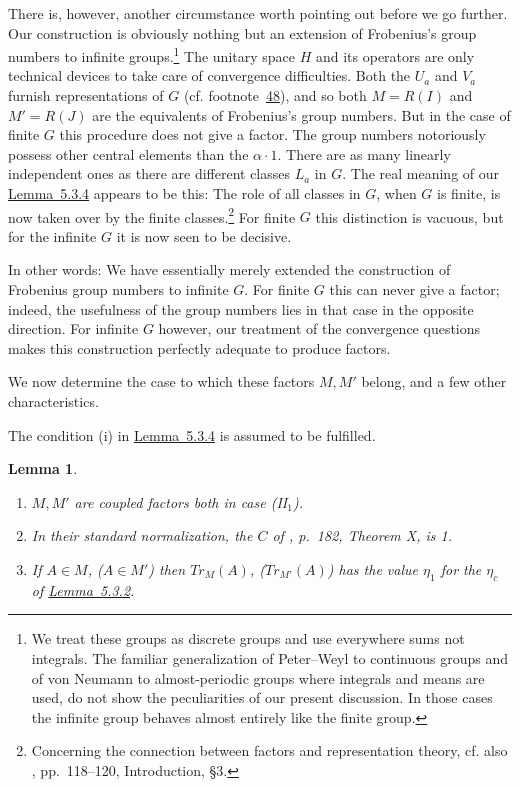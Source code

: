 \documentclass[b5paper,twoside]{article}
\newcommand{\lemref}[2]{\hyperref[#1]{\mbox{Lemma~#2}}}
\theoremstyle{mvnplain}
\newtheorem{lemma}{Lemma}[section]
\newcommand{\M}{\mathbf M}
\newcommand{\R}{\mathbf R}
\newcommand{\Hilbert}{\mathfrak H}
\def\M{M}%
\def\R{R}%
\def\Hilbert{H}%
\def\operatorname#1{#1}%
\def\mathfrak#1{#1}%
\begin{document}
There is, however, another circumstance worth pointing out before we go
further. Our construction is obviously nothing but an extension of
Frobenius's group numbers to infinite groups.\footnote{We treat these groups
as discrete groups and use everywhere sums not integrals. The familiar
generalization of Peter--Weyl to continuous groups and of von Neumann to
almost-periodic groups where integrals and means are used, do not show the
peculiarities of our present discussion. In those cases the infinite group
behaves almost entirely like the finite group.} The unitary space \(\Hilbert\)
and its operators are only technical devices to take care of convergence
difficulties. Both the \(U_a\) and \(V_a\) furnish representations of
\(\mathfrak G\) (cf. footnote~\hyperref[fn:48]{48}), and so both \(\M=\R(I)\) and
\(\M'=\R(J)\) are the equivalents of Frobenius's group numbers. But in the
case of finite \(\mathfrak G\) this procedure does not give a factor. The group
numbers notoriously possess other central elements than the \(\alpha\cdot1\).
There are as many linearly independent ones as there are different classes
\(\mathfrak L_a\) in \(\mathfrak G\). The real meaning of our
\lemref{lem:5.3.4}{5.3.4} appears to be this: The role of all classes in
\(\mathfrak G\), when \(\mathfrak G\) is finite, is now taken over by the
finite classes.\footnote{Concerning the connection between factors and
representation theory, cf. also \cite{ref5}, pp.~118--120,
Introduction, \S3.} For finite \(\mathfrak G\) this distinction is vacuous,
but for the infinite \(\mathfrak G\) it is now seen to be decisive.

In other words: We have essentially merely extended the construction of
Frobenius group numbers to infinite \(\mathfrak G\). For finite
\(\mathfrak G\) this can never give a factor; indeed, the usefulness of the
group numbers lies in that case in the opposite direction. For infinite
\(\mathfrak G\) however, our treatment of the convergence questions makes
this construction perfectly adequate to produce factors.

We now determine the case to which these factors \(\M,\M'\) belong, and a few
other characteristics.

The condition (i) in \lemref{lem:5.3.4}{5.3.4} is assumed to be fulfilled.

\begin{lemma}\label{lem:5.3.5}
\begin{enumerate}[label=(\roman*)]
\item \(\M,\M'\) are coupled factors both in case (II\(_1\)).
\item In their standard normalization, the \(C\) of
\cite{ref5}, p.~182, Theorem X, is 1.
\item If \(A\in\M\), (\(A\in\M'\)) then
\(\operatorname{Tr}_{\M}(A)\), (\(\operatorname{Tr}_{\M'}(A)\)) has the
value \(\eta_1\) for the \(\eta_c\) of \lemref{lem:5.3.2}{5.3.2}.
\end{enumerate}
\end{lemma}
\end{document}
